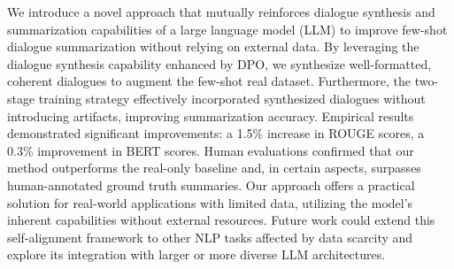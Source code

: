 We introduce a novel approach that mutually reinforces dialogue synthesis and summarization capabilities of a large language model (LLM) to improve few-shot dialogue summarization without relying on external data.
By leveraging the dialogue synthesis capability enhanced by DPO, we synthesize well-formatted, coherent dialogues to augment the few-shot real dataset.
Furthermore, the two-stage training strategy effectively incorporated synthesized dialogues without introducing artifacts, improving summarization accuracy.
Empirical results demonstrated significant improvements: a 1.5\% increase in ROUGE scores, a 0.3\% improvement in BERT scores.
Human evaluations confirmed that our method outperforms the real-only baseline and, in certain aspects, surpasses human-annotated ground truth summaries. 
Our approach offers a practical solution for real-world applications with limited data, utilizing the model's inherent capabilities without external resources. 
Future work could extend this self-alignment framework to other NLP tasks affected by data scarcity and explore its integration with larger or more diverse LLM architectures.






